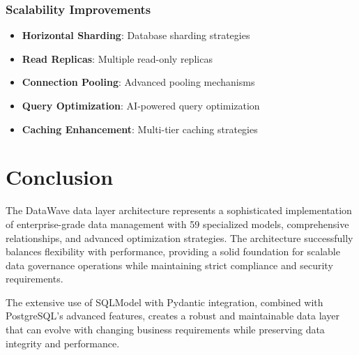 \subsubsection{Scalability Improvements}
\begin{itemize}
    \item \textbf{Horizontal Sharding}: Database sharding strategies
    \item \textbf{Read Replicas}: Multiple read-only replicas
    \item \textbf{Connection Pooling}: Advanced pooling mechanisms
    \item \textbf{Query Optimization}: AI-powered query optimization
    \item \textbf{Caching Enhancement}: Multi-tier caching strategies
\end{itemize}

\section{Conclusion}

The DataWave data layer architecture represents a sophisticated implementation of enterprise-grade data management with 59 specialized models, comprehensive relationships, and advanced optimization strategies. The architecture successfully balances flexibility with performance, providing a solid foundation for scalable data governance operations while maintaining strict compliance and security requirements.

The extensive use of SQLModel with Pydantic integration, combined with PostgreSQL's advanced features, creates a robust and maintainable data layer that can evolve with changing business requirements while preserving data integrity and performance.
